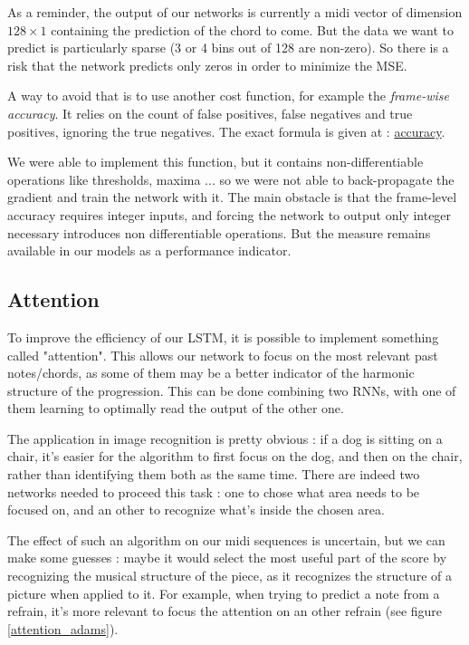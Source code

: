 \documentclass{article}
\begin{document}
As a reminder, the output of our networks is currently a midi vector of dimension $128 \times 1$ containing the prediction of the chord to come. But the data we want to predict is particularly sparse (3 or 4 bins out of 128 are non-zero). So there is a risk that the network predicts only zeros in order to minimize the MSE.

A way to avoid that is to use another cost function, for example the \textit{frame-wise accuracy}. It relies on the count of false positives, false negatives and true positives, ignoring the true negatives. The exact formula is given at : \href{http://citeseerx.ist.psu.edu/viewdoc/download?doi=10.1.1.205.9184&rep=rep1&type=pdf}{accuracy}.

We were able to implement this function, but it contains non-differentiable operations like thresholds, maxima ... so we were not able to back-propagate the gradient and train the network with it. The main obstacle is that the frame-level accuracy requires integer inputs, and forcing the network to output only integer necessary introduces non differentiable operations. But the measure remains available in our models as a performance indicator.

\subsection{Attention}
To improve the efficiency of our LSTM, it is possible to implement something called "attention". This allows our network to focus on the most relevant past notes/chords, as some of them may be a better indicator of the harmonic structure of the progression. This can be done combining two RNNs, with one of them learning to optimally read the output of the other one.

The application in image recognition is pretty obvious : if a dog is sitting on a chair, it's easier for the algorithm to first focus on the dog, and then on the chair, rather than identifying them both as the same time. There are indeed two networks needed to proceed this task : one to chose what area needs to be focused on, and an other to recognize what's inside the chosen area.

The effect of such an algorithm on our midi sequences is uncertain, but we can make some guesses : maybe it would select the most useful part of the score by recognizing the musical structure of the piece, as it recognizes the structure of a picture when applied to it. For example, when trying to predict a note from a refrain, it's more relevant to focus the attention on an other refrain  (see figure \ref{attention_adams}).
\end{document}
